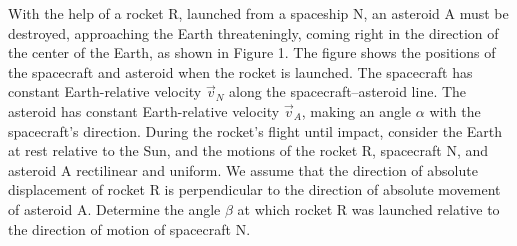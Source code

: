 With the help of a rocket R, launched from a spaceship N, an asteroid A
must be destroyed, approaching the Earth threateningly, coming right in
the direction of the center of the Earth, as shown in Figure 1. The figure
shows the positions of the spacecraft and asteroid when the rocket is
launched. The spacecraft has constant Earth-relative velocity $\vec v_N$
along the spacecraft--asteroid line. The asteroid has constant Earth-relative
velocity $\vec v_A$, making an angle $\alpha$ with the spacecraft's direction.
During the rocket's flight until impact, consider the Earth at rest relative
to the Sun, and the motions of the rocket R, spacecraft N, and asteroid A
rectilinear and uniform.
We assume that the direction of absolute displacement of rocket R is
perpendicular to the direction of absolute movement of asteroid A.
Determine the angle $\beta$ at which rocket R was launched relative to the
direction of motion of spacecraft N.
